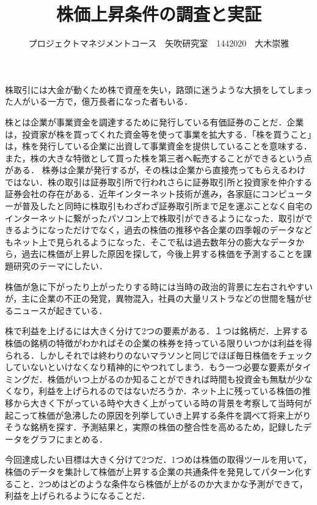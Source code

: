 \documentclass[uplatex,twocolumn,dvipdfmx]{jsarticle}
\title{\vspace{-5mm}\fontsize{14pt}{0pt}\selectfont 株価上昇条件の調査と実証}
\author{\normalsize プロジェクトマネジメントコース　矢吹研究室　1442020　大木崇雅}
\date{}
\begin{document}
\fontsize{10.5pt}{\baselineskip}\selectfont
\maketitle






株取引には大金が動くため株で資産を失い，路頭に迷うような大損をしてしまった人がいる一方で，億万長者になった者もいる．

株とは企業が事業資金を調達するために発行している有価証券のことだ．企業は，投資家が株を買ってくれた資金等を使って事業を拡大する．「株を買うこと」は，株を発行している企業に出資して事業資金を提供していることを意味する．また，株の大きな特徴として買った株を第三者へ転売することができるという点がある． 株券は企業が発行するが，その株は企業から直接売ってもらえるわけではない．株の取引は証券取引所で行われさらに証券取引所と投資家を仲介する証券会社の存在がある．近年インターネット技術が進み，各家庭にコンピューターが普及したと同時に株取引もわざわざ証券取引所まで足を運ぶことなく自宅のインターネットに繋がったパソコン上で株取引ができるようになった．取引ができるようになっただけでなく，過去の株価の推移や各企業の四季報のデータなどもネット上で見られるようになった．そこで私は過去数年分の膨大なデータから，過去に株価が上昇した原因を探して，今後上昇する株価を予測することを課題研究のテーマにしたい．

株価が急に下がったり上がったりする時には当時の政治的背景に左右されやすいが，主に企業の不正の発覚，異物混入，社員の大量リストラなどの世間を騒がせるニュースが起きている．

株で利益を上げるには大きく分けて2つの要素がある．１つは銘柄だ．上昇する株価の銘柄の特徴がわかればその企業の株券を持っている限りいつかは利益を得られる．しかしそれでは終わりのないマラソンと同じでほぼ毎日株価をチェックしていないといけなくなり精神的にやつれてしまう．もう一つ必要な要素がタイミングだ．株価がいつ上がるのか知ることができれば時間も投資金も無駄が少なくなり，利益を上げられるのではないだろうか．ネット上に残っている株価の推移から大きく下がっている時や大きく上がっている時の背景を考察して当時何が起こって株価が急沸したの原因を列挙していき上昇する条件を調べて将来上がりそうな銘柄を探す．予測結果と，実際の株価の整合性を高めるため，記録したデータをグラフにまとめる．

今回達成したい目標は大きく分けて2つだ．1つめは株価の取得ツールを用いて，株価のデータを集計して株価が上昇する企業の共通条件を発見してパターン化すること．2つめはどのような条件なら株価が上がるのか大まかな予測ができて，利益を上げられるようになることだ．

\nocite{BB19543658}
\nocite{BA78827129}
\nocite{122222}



\end{document}

